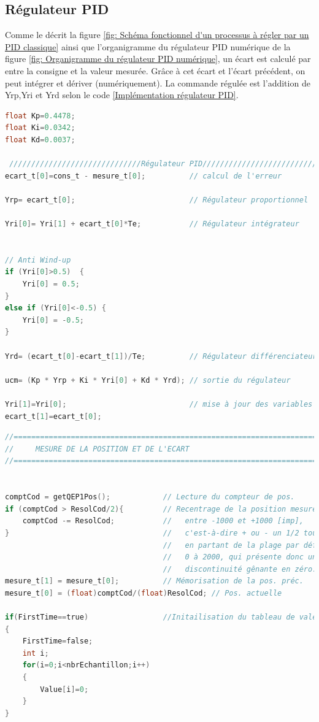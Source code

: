 \subsection{Régulateur PID}
Comme le décrit la figure \ref{fig: Schéma fonctionnel d'un processus à régler par un PID classique} ainsi que l'organigramme du régulateur PID numérique de la figure \ref{fig: Organigramme du régulateur PID numérique}, un écart est calculé par entre la consigne et la valeur mesurée. Grâce à cet écart et l'écart précédent, on peut intégrer et dériver (numériquement). La commande régulée est l'addition de Yrp,Yri et Yrd selon le code \ref{Implémentation régulateur PID}. 

\begin{lstlisting}[language=C,caption={Implémentation Régulateur PID}, label={Implémentation régulateur PID}]
float Kp=0.4478;
float Ki=0.0342;
float Kd=0.0037;	
	
 //////////////////////////////Régulateur PID//////////////////////////////////////
ecart_t[0]=cons_t - mesure_t[0];          // calcul de l'erreur

Yrp= ecart_t[0];                          // Régulateur proportionnel

Yri[0]= Yri[1] + ecart_t[0]*Te;           // Régulateur intégrateur


// Anti Wind-up
if (Yri[0]>0.5)  {
	Yri[0] = 0.5;
}
else if (Yri[0]<-0.5) {
	Yri[0] = -0.5;
}

Yrd= (ecart_t[0]-ecart_t[1])/Te;          // Régulateur différenciateur

ucm= (Kp * Yrp + Ki * Yri[0] + Kd * Yrd); // sortie du régulateur

Yri[1]=Yri[0];                            // mise à jour des variables dans le temps
ecart_t[1]=ecart_t[0];
\end{lstlisting}

\newpage
\begin{lstlisting}[language=C,caption={Mesure de la position et de l'écart}, label={Mesure de la position et de l'écart}]
//=====================================================================
//	   MESURE DE LA POSITION ET DE L'ECART
//=====================================================================


comptCod = getQEP1Pos();            // Lecture du compteur de pos.
if (comptCod > ResolCod/2){ 		// Recentrage de la position mesurée
	comptCod -= ResolCod;           //   entre -1000 et +1000 [imp],
}                                   //   c'est-à-dire + ou - un 1/2 tour,
									//   en partant de la plage par défaut
									//   0 à 2000, qui présente donc une
									//   discontinuité gênante en zéro.
mesure_t[1] = mesure_t[0];          // Mémorisation de la pos. préc.
mesure_t[0] = (float)comptCod/(float)ResolCod; // Pos. actuelle

if(FirstTime==true)                 //Initailisation du tableau de valeur Value à 0
{
	FirstTime=false;
	int i;
	for(i=0;i<nbrEchantillon;i++)
	{
		Value[i]=0;
	}
}
\end{lstlisting}

